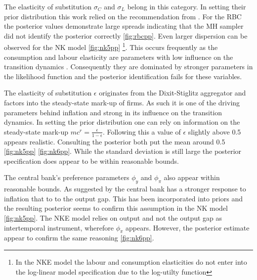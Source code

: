 \documentclass[12pt,a4paper,english]{article} %
\begin{document}
	
	The elasticity of substitution $\sigma_C$ and $\sigma_L$ belong in this category. In setting their prior distribution this work relied on the recommendation from \cite{del_negro_forming_2008}. For the RBC the posterior values demonstrate large spreads indicating that the MH sampler did not identify the posterior correctly \ref{fig:rbcpp}. Even larger dispersion can be observed for the NK model \ref{fig:nk5pp} \footnote{ In the NKE model the labour and consumption elasticities do not enter into the log-linear model specification due to the log-utilty function}. This occurs frequently as the consumption and labour elasticity are parameters with low influence on the transition dynamics \cite{guerron-quintana_bayesian_2013}. Consequently they are dominated by stronger parameters in the likelihood function and the posterior identification fails for these variables.
	
	The elasticity of substitution $\epsilon$ originates from the Dixit-Stiglitz aggregator and factors into the steady-state mark-up of firms. As such it is one of the driving parameters behind inflation and strong in its influence on the transition dynamics. In setting the prior distribution one can rely on information on the steady-state mark-up $mc^r = \frac{\epsilon}{1-\epsilon}$. Following this a value of $\epsilon$ slightly above 0.5 appears realistic. Consulting the posterior both put the mean around 0.5 \ref{fig:nk5pp} \ref{fig:nk6pp}. While the standard deviation is still large the posterior specification does appear to be within reasonable bounds. 
	
	The central bank's preference parameters $\phi_y$ and $\phi_{\pi}$ also appear within reasonable bounds. As suggested by \cite{gali_monetary_2008} the central bank has a stronger response to inflation that to to the output gap. This has been incorporated into priors and the resulting posterior seems to confirm this assumption in the NK model \ref{fig:nk5pp}. The NKE model relies on output and not the output gap as intertemporal instrument, wherefore $\phi_{\pi}$ appears. However, the posterior estimate appear to confirm the same reasoning \ref{fig:nk6pp}.
	
\end{document}
